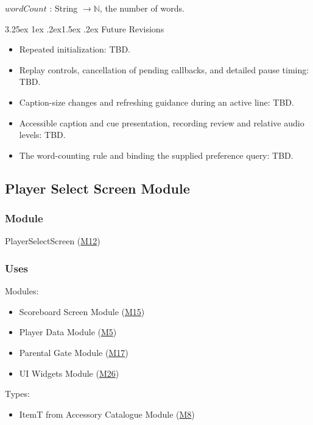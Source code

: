 \documentclass[10pt, titlepage]{article}
\makeatletter
\newcommand{\misref}[2]{\hyperref[mis:#1]{M#2}}
\renewcommand\paragraph{\@startsection{paragraph}{4}{\z@}%
  {3.25ex \@plus 1ex \@minus .2ex}{1.5ex \@plus .2ex}%
  {\normalfont\normalsize\bfseries}}
\newcommand{\N}{\mathbb{N}}
\newcommand{\T}[1]{\mathit{#1}}          %
\makeatother
\begin{document}
\noindent $\T{wordCount}$ : String $\to \N$, the number of words.

\paragraph{Future Revisions}

\begin{itemize}
\item Repeated initialization: TBD.
\item Replay controls, cancellation of pending callbacks, and detailed pause timing: TBD.
\item Caption-size changes and refreshing guidance during an active line: TBD.
\item Accessible caption and cue presentation, recording review and
  relative audio levels: TBD.
\item The word-counting rule and binding the supplied preference query: TBD.
\end{itemize}

\newpage
\subsection{Player Select Screen Module} \label{mis:PlayerSelect}

\subsubsection{Module}

PlayerSelectScreen (\misref{PlayerSelect}{12})

\subsubsection{Uses}

Modules:
\begin{itemize}
\item Scoreboard Screen Module (\misref{Scoreboard}{15})
\item Player Data Module (\misref{PlayerData}{5})
\item Parental Gate Module (\misref{Gate}{17})
\item UI Widgets Module (\misref{Widgets}{26})
\end{itemize}

Types:
\begin{itemize}
\item ItemT from Accessory Catalogue Module (\misref{Accessories}{8})
\end{itemize}
\end{document}
